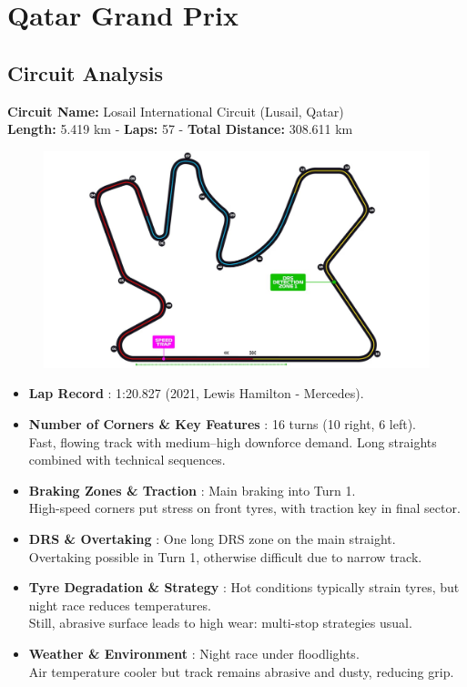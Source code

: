 \section{Qatar Grand Prix}

\subsection{Circuit Analysis}

\textbf{Circuit Name:} Losail International Circuit (Lusail, Qatar) \\
\textbf{Length:} 5.419 km - \textbf{Laps:} 57 - \textbf{Total Distance:} 308.611 km

\begin{figure}[H]
    \centering
    \includegraphics[width=0.75\linewidth]{images/23.Qatar_Circuit.jpg}
\end{figure}

\begin{itemize}
    \item \textbf{Lap Record} : 1:20.827 (2021, Lewis Hamilton - Mercedes).

    \item \textbf{Number of Corners \& Key Features} : 16 turns (10 right, 6 left). \\
    Fast, flowing track with medium–high downforce demand. Long straights combined with technical sequences.
    
    \item \textbf{Braking Zones \& Traction} : Main braking into Turn 1. \\
    High-speed corners put stress on front tyres, with traction key in final sector.

    \item \textbf{DRS \& Overtaking} : One long DRS zone on the main straight. \\
    Overtaking possible in Turn 1, otherwise difficult due to narrow track.

    \item \textbf{Tyre Degradation \& Strategy} : Hot conditions typically strain tyres, but night race reduces temperatures. \\
    Still, abrasive surface leads to high wear: multi-stop strategies usual.

    \item \textbf{Weather \& Environment} : Night race under floodlights. \\
    Air temperature cooler but track remains abrasive and dusty, reducing grip.
\end{itemize}

